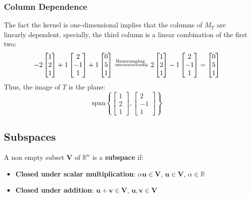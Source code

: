 \documentclass[a4paper, 9pt]{extarticle}
\begin{document}
\subsubsection{Column Dependence}
The fact the kernel is one-dimensional implies that the columns of $M_T$ are linearly dependent. specially, the third column is a linear combination of the first two:
$$
  -2
  \begin{bmatrix}
    1 \\
    2 \\
    1
  \end{bmatrix}
  +1
  \begin{bmatrix}
    2  \\
    -1 \\
    1
  \end{bmatrix}
  + 1
  \begin{bmatrix}
    0 \\
    5 \\
    1
  \end{bmatrix}
  \xRightarrow[]{\text{Rearranging}}
  2
  \begin{bmatrix}
    1 \\
    2 \\
    1
  \end{bmatrix}
  -1
  \begin{bmatrix}
    2  \\
    -1 \\
    1
  \end{bmatrix}
  =
  \begin{bmatrix}
    0 \\
    5 \\
    1
  \end{bmatrix}
$$
Thus, the image of $T$ is the plane:
$$\text{span} \left \{ \begin{bmatrix}
    1 \\
    2 \\
    1
  \end{bmatrix}
  , \begin{bmatrix}
    2  \\
    -1 \\
    1
  \end{bmatrix}
  \right \}
$$
\subsection{Subspaces}
\begin{definitionbox}{}{}
  A non empty subset $\textbf{V}$ of $\mathbb{R}^n$ is a \textbf{subspace} if:
  \begin{itemize}
    \item \textbf{Closed under scalar multiplication}: $\alpha \mathbf{u} \in \textbf{V}$, $\mathbf{u} \in \textbf{V}$, $\alpha \in \mathbb{R}$
    \item \textbf{Closed under addition}: $\mathbf{u} + \mathbf{v} \in \mathbf{V}$, $\mathbf{u}, \mathbf{v} \in \textbf{V}$
  \end{itemize}
\end{definitionbox}
\end{document}
